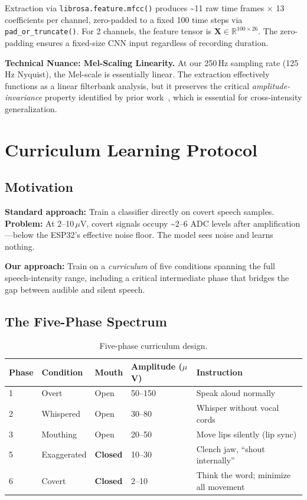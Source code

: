 \documentclass[11pt, a4paper]{article}
\begin{document}
Extraction via \texttt{librosa.feature.mfcc()} produces \textasciitilde11 raw time frames $\times$ 13 coefficients per channel, zero-padded to a fixed 100 time steps via \texttt{pad\_or\_truncate()}. For 2 channels, the feature tensor is $\mathbf{X} \in \mathbb{R}^{100 \times 26}$. The zero-padding ensures a fixed-size CNN input regardless of recording duration.

\textbf{Technical Nuance: Mel-Scaling Linearity.} At our 250\,Hz sampling rate (125\,Hz Nyquist), the Mel-scale is essentially linear. The extraction effectively functions as a linear filterbank analysis, but it preserves the critical \emph{amplitude-invariance} property identified by prior work~\cite{kapur2018}, which is essential for cross-intensity generalization.

\section{Curriculum Learning Protocol}
\label{sec:curriculum}

\subsection{Motivation}

\textbf{Standard approach:} Train a classifier directly on covert speech samples.
\textbf{Problem:} At 2--10\,$\mu$V, covert signals occupy \textasciitilde2--6 ADC levels after amplification---below the ESP32's effective noise floor. The model sees noise and learns nothing.

\textbf{Our approach:} Train on a \emph{curriculum} of five conditions spanning the full speech-intensity range, including a critical intermediate phase that bridges the gap between audible and silent speech.

\subsection{The Five-Phase Spectrum}

\begin{table}[h]
\centering
\caption{Five-phase curriculum design.}
\label{tab:curriculum}
\begin{tabular}{@{}lllll@{}}
\toprule
Phase & Condition & Mouth & Amplitude ($\mu$V) & Instruction \\
\midrule
1 & Overt         & Open     & 50--150 & Speak aloud normally \\
2 & Whispered     & Open     & 30--80  & Whisper without vocal cords \\
3 & Mouthing      & Open     & 20--50  & Move lips silently (lip sync) \\
5 & Exaggerated   & \textbf{Closed} & 10--30  & Clench jaw, ``shout internally'' \\
6 & Covert        & \textbf{Closed} & 2--10   & Think the word; minimize all movement \\
\bottomrule
\end{tabular}
\end{table}
\end{document}
